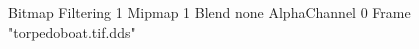 {Bitmap
	{Filtering 1}
	{Mipmap 1}
	{Blend none}
	{AlphaChannel 0}
	{Frame "torpedoboat.tif.dds"}
}
